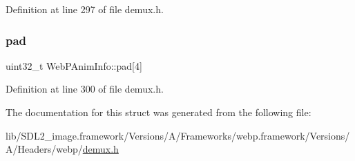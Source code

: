Definition at line 297 of file demux.\+h.

\mbox{\label{struct_web_p_anim_info_a3d98756b9a488001d7a9b99cfd6f0f1e}} 
\subsubsection{\texorpdfstring{pad}{pad}}
{\footnotesize\ttfamily uint32\+\_\+t Web\+P\+Anim\+Info\+::pad\mbox{[}4\mbox{]}}



Definition at line 300 of file demux.\+h.



The documentation for this struct was generated from the following file\+:\begin{DoxyCompactItemize}
\item 
lib/\+S\+D\+L2\+\_\+image.\+framework/\+Versions/\+A/\+Frameworks/webp.\+framework/\+Versions/\+A/\+Headers/webp/\mbox{\hyperlink{demux_8h}{demux.\+h}}\end{DoxyCompactItemize}
